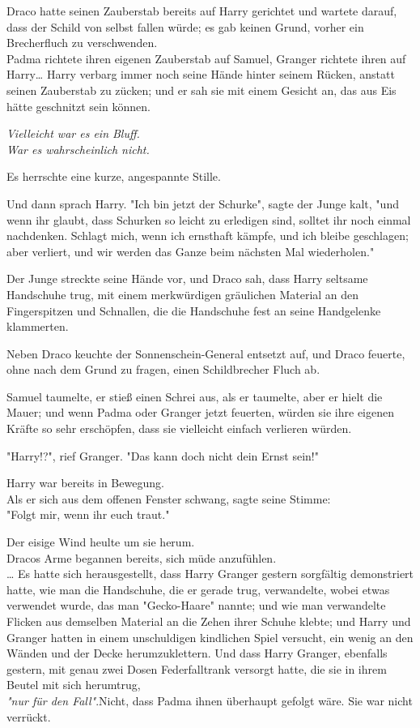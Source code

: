 {Draco hatte seinen Zauberstab bereits auf Harry gerichtet und wartete darauf, dass der Schild von selbst fallen würde; es gab keinen Grund, vorher ein Brecherfluch zu verschwenden.\\ Padma richtete ihren eigenen Zauberstab auf Samuel, Granger richtete ihren auf Harry… Harry verbarg immer noch seine Hände hinter seinem Rücken, anstatt seinen Zauberstab zu zücken; und er sah sie mit einem Gesicht an, das aus Eis hätte geschnitzt sein können.

\emph{Vielleicht war es ein Bluff.}\\ \emph{War es wahrscheinlich nicht.}

Es herrschte eine kurze, angespannte Stille.

Und dann sprach Harry. "Ich bin jetzt der Schurke", sagte der Junge kalt, "und wenn ihr glaubt, dass Schurken so leicht zu erledigen sind, solltet ihr noch einmal nachdenken. Schlagt mich, wenn ich ernsthaft kämpfe, und ich bleibe geschlagen; aber verliert, und wir werden das Ganze beim nächsten Mal wiederholen."

Der Junge streckte seine Hände vor, und Draco sah, dass Harry seltsame Handschuhe trug, mit einem merkwürdigen gräulichen Material an den Fingerspitzen und Schnallen, die die Handschuhe fest an seine Handgelenke klammerten.

Neben Draco keuchte der Sonnenschein-General entsetzt auf, und Draco feuerte, ohne nach dem Grund zu fragen, einen Schildbrecher Fluch ab.

Samuel taumelte, er stieß einen Schrei aus, als er taumelte, aber er hielt die Mauer; und wenn Padma oder Granger jetzt feuerten, würden sie ihre eigenen Kräfte so sehr erschöpfen, dass sie vielleicht einfach verlieren würden.

"Harry!?", rief Granger. "Das kann doch nicht dein Ernst sein!"

Harry war bereits in Bewegung.\\ Als er sich aus dem offenen Fenster schwang, sagte seine Stimme:\\ "Folgt mir, wenn ihr euch traut."

Der eisige Wind heulte um sie herum.\\ Dracos Arme begannen bereits, sich müde anzufühlen.\\ … Es hatte sich herausgestellt, dass Harry Granger gestern sorgfältig demonstriert hatte, wie man die Handschuhe, die er gerade trug, verwandelte, wobei etwas verwendet wurde, das man "Gecko-Haare" nannte; und wie man verwandelte Flicken aus demselben Material an die Zehen ihrer Schuhe klebte; und Harry und Granger hatten in einem unschuldigen kindlichen Spiel versucht, ein wenig an den Wänden und der Decke herumzuklettern. Und dass Harry Granger, ebenfalls gestern, mit genau zwei Dosen Federfalltrank versorgt hatte, die sie in ihrem Beutel mit sich herumtrug,\\ \emph{"nur für den Fall"}.Nicht, dass Padma ihnen überhaupt gefolgt wäre. Sie war nicht verrückt.

}
